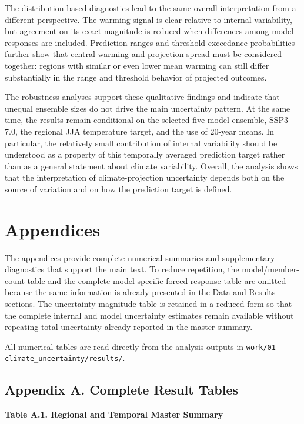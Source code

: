 \documentclass[
]{krantz}
\begin{document}
The distribution-based diagnostics lead to the same overall interpretation from a different perspective. The warming signal is clear relative to internal variability, but agreement on its exact magnitude is reduced when differences among model responses are included. Prediction ranges and threshold exceedance probabilities further show that central warming and projection spread must be considered together: regions with similar or even lower mean warming can still differ substantially in the range and threshold behavior of projected outcomes.

The robustness analyses support these qualitative findings and indicate that unequal ensemble sizes do not drive the main uncertainty pattern. At the same time, the results remain conditional on the selected five-model ensemble, SSP3-7.0, the regional JJA temperature target, and the use of 20-year means. In particular, the relatively small contribution of internal variability should be understood as a property of this temporally averaged prediction target rather than as a general statement about climate variability. Overall, the analysis shows that the interpretation of climate-projection uncertainty depends both on the source of variation and on how the prediction target is defined.

\section{Appendices}\label{appendices}

The appendices provide complete numerical summaries and supplementary diagnostics that support the main text. To reduce repetition, the model/member-count table and the complete model-specific forced-response table are omitted because the same information is already presented in the Data and Results sections. The uncertainty-magnitude table is retained in a reduced form so that the complete internal and model uncertainty estimates remain available without repeating total uncertainty already reported in the master summary.

All numerical tables are read directly from the analysis outputs in \texttt{work/01-climate\_uncertainty/results/}.

\subsection{Appendix A. Complete Result Tables}\label{appendix-a.-complete-result-tables}

\textbf{Table A.1. Regional and Temporal Master Summary}
\end{document}
